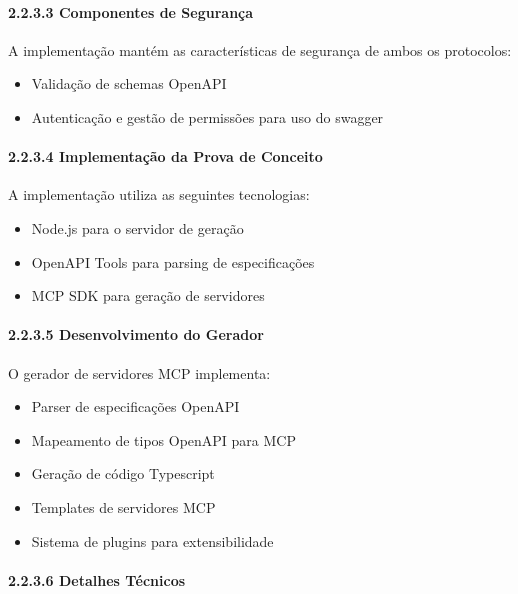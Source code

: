 \documentclass[
]{article}
\providecommand{\tightlist}{%
  \setlength{\itemsep}{0pt}\setlength{\parskip}{0pt}}
\begin{document}
\paragraph{2.2.3.3 Componentes de
Segurança}\label{componentes-de-seguranuxe7a-1}

A implementação mantém as características de segurança de ambos os
protocolos:

\begin{itemize}
\tightlist
\item
  Validação de schemas OpenAPI
\item
  Autenticação e gestão de permissões para uso do swagger
\end{itemize}

\paragraph{2.2.3.4 Implementação da Prova de
Conceito}\label{implementauxe7uxe3o-da-prova-de-conceito-1}

A implementação utiliza as seguintes tecnologias:

\begin{itemize}
\tightlist
\item
  Node.js para o servidor de geração
\item
  OpenAPI Tools para parsing de especificações
\item
  MCP SDK para geração de servidores
\end{itemize}

\paragraph{2.2.3.5 Desenvolvimento do
Gerador}\label{desenvolvimento-do-gerador}

O gerador de servidores MCP implementa:

\begin{itemize}
\tightlist
\item
  Parser de especificações OpenAPI
\item
  Mapeamento de tipos OpenAPI para MCP
\item
  Geração de código Typescript
\item
  Templates de servidores MCP
\item
  Sistema de plugins para extensibilidade
\end{itemize}

\paragraph{2.2.3.6 Detalhes Técnicos}\label{detalhes-tuxe9cnicos-1}
\end{document}
